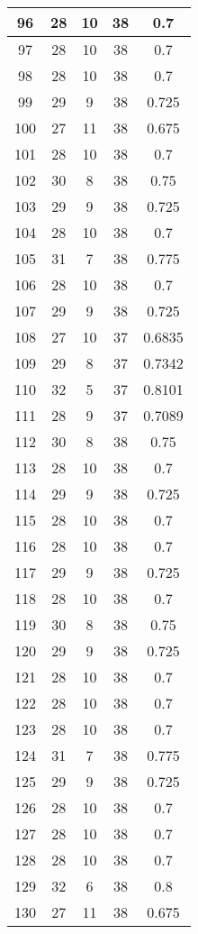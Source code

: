 \documentclass[letterpaper, 12pt]{article}
\begin{document}
\begin{longtable}{|c|c|c|c|c|}
\hline
96 & 28 & 10 & 38 & 0.7 \\
\hline
97 & 28 & 10 & 38 & 0.7 \\
\hline
98 & 28 & 10 & 38 & 0.7 \\
\hline
99 & 29 & 9 & 38 & 0.725 \\
\hline
100 & 27 & 11 & 38 & 0.675 \\
\hline
101 & 28 & 10 & 38 & 0.7 \\
\hline
102 & 30 & 8 & 38 & 0.75 \\
\hline
103 & 29 & 9 & 38 & 0.725 \\
\hline
104 & 28 & 10 & 38 & 0.7 \\
\hline
105 & 31 & 7 & 38 & 0.775 \\
\hline
106 & 28 & 10 & 38 & 0.7 \\
\hline
107 & 29 & 9 & 38 & 0.725 \\
\hline
108 & 27 & 10 & 37 & 0.6835 \\
\hline
109 & 29 & 8 & 37 & 0.7342 \\
\hline
110 & 32 & 5 & 37 & 0.8101 \\
\hline
111 & 28 & 9 & 37 & 0.7089 \\
\hline
112 & 30 & 8 & 38 & 0.75 \\
\hline
113 & 28 & 10 & 38 & 0.7 \\
\hline
114 & 29 & 9 & 38 & 0.725 \\
\hline
115 & 28 & 10 & 38 & 0.7 \\
\hline
116 & 28 & 10 & 38 & 0.7 \\
\hline
117 & 29 & 9 & 38 & 0.725 \\
\hline
118 & 28 & 10 & 38 & 0.7 \\
\hline
119 & 30 & 8 & 38 & 0.75 \\
\hline
120 & 29 & 9 & 38 & 0.725 \\
\hline
121 & 28 & 10 & 38 & 0.7 \\
\hline
122 & 28 & 10 & 38 & 0.7 \\
\hline
123 & 28 & 10 & 38 & 0.7 \\
\hline
124 & 31 & 7 & 38 & 0.775 \\
\hline
125 & 29 & 9 & 38 & 0.725 \\
\hline
126 & 28 & 10 & 38 & 0.7 \\
\hline
127 & 28 & 10 & 38 & 0.7 \\
\hline
128 & 28 & 10 & 38 & 0.7 \\
\hline
129 & 32 & 6 & 38 & 0.8 \\
\hline
130 & 27 & 11 & 38 & 0.675 \\

\end{longtable}
\end{document}
